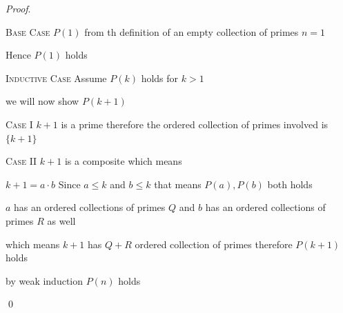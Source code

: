 
\textit{Proof}.

\textsc{Base Case}
$P(1)$ from th definition of an empty collection of primes $n=1$

Hence $P(1)$ holds

\textsc{Inductive Case}
Assume $P(k)$ holds for $k > 1$

we will now show $P(k+1)$

\textsc{Case I} $k+1$ is a prime therefore the ordered collection of primes involved is $\{k+1\}$

\textsc{Case II} $k+1$ is a composite which means

$k+1 = a \cdot b$ Since $a \leq k$ and $b \leq k$ that means $P(a), P(b)$ both holds

$a$ has an ordered collections of primes $Q$ and $b$ has an ordered collections of primes $R$ as well

which means $k+1$ has $Q + R$ ordered collection of primes therefore $P(k+1)$ holds

by weak induction $P(n)$ holds

\qed

